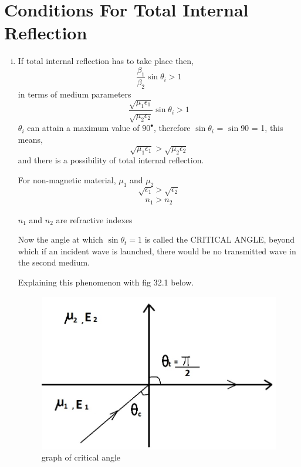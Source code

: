\section{Conditions For Total Internal Reflection}
\begin{enumerate}[(i)]
\item If total internal reflection has to take place then,
\begin{equation*}
\frac{\beta_1}{\beta_2}\sin\theta_i > 1
\end{equation*}
in terms of medium parameters
\begin{equation*}
\frac{\sqrt{\mu_1\epsilon_1}}{\sqrt{\mu_2\epsilon_2}}\sin\theta_i > 1
\end{equation*}
$\theta_i$ can attain a maximum value of $90^\bullet$, therefore $\sin\theta_i$ = $\sin$90 = 1, this means,
\begin{equation}
\sqrt{\mu_1\epsilon_1} > \sqrt{\mu_2\epsilon_2}
\end{equation}
and there is a possibility of total internal reflection.

For non-magnetic material, $\mu_1$ and $\mu_2$
\begin{equation*}
\sqrt{\epsilon_1} > \sqrt{\epsilon_2}
\end{equation*}
\begin{align*}
n_1 > n_2
\end{align*} \begin{center}
$n_1$ and $n_2$ are refractive indexes
\end{center} 
Now the angle at which $\sin\theta_t = 1$ is called the CRITICAL ANGLE, beyond which if an incident wave is launched, there would be no transmitted wave in the second medium.

Explaining this phenomenon with fig 32.1 below.
\begin{figure}[h]
\centering
\includegraphics[width=.7\linewidth]{./graphics/fig321}
\caption{graph of critical angle}
\end{figure}


\end{enumerate}
